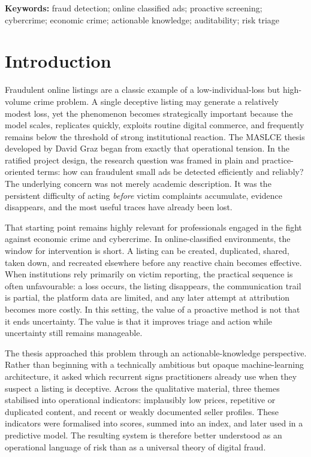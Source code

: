 \documentclass[11pt,a4paper]{article}
\begin{document}
\textbf{Keywords:} fraud detection; online classified ads; proactive screening; cybercrime; economic crime; actionable knowledge; auditability; risk triage

\newpage

\tableofcontents

\newpage

\section{Introduction}
Fraudulent online listings are a classic example of a low-individual-loss but high-volume crime problem. A single deceptive listing may generate a relatively modest loss, yet the phenomenon becomes strategically important because the model scales, replicates quickly, exploits routine digital commerce, and frequently remains below the threshold of strong institutional reaction. The MASLCE thesis developed by David Graz began from exactly that operational tension. In the ratified project design, the research question was framed in plain and practice-oriented terms: how can fraudulent small ads be detected efficiently and reliably? The underlying concern was not merely academic description. It was the persistent difficulty of acting \emph{before} victim complaints accumulate, evidence disappears, and the most useful traces have already been lost.

That starting point remains highly relevant for professionals engaged in the fight against economic crime and cybercrime. In online-classified environments, the window for intervention is short. A listing can be created, duplicated, shared, taken down, and recreated elsewhere before any reactive chain becomes effective. When institutions rely primarily on victim reporting, the practical sequence is often unfavourable: a loss occurs, the listing disappears, the communication trail is partial, the platform data are limited, and any later attempt at attribution becomes more costly. In this setting, the value of a proactive method is not that it ends uncertainty. The value is that it improves triage and action while uncertainty still remains manageable.

The thesis approached this problem through an actionable-knowledge perspective. Rather than beginning with a technically ambitious but opaque machine-learning architecture, it asked which recurrent signs practitioners already use when they suspect a listing is deceptive. Across the qualitative material, three themes stabilised into operational indicators: implausibly low prices, repetitive or duplicated content, and recent or weakly documented seller profiles. These indicators were formalised into scores, summed into an index, and later used in a predictive model. The resulting system is therefore better understood as an operational language of risk than as a universal theory of digital fraud.
\end{document}
